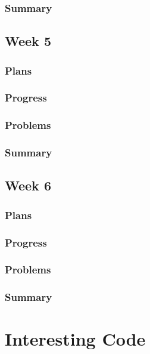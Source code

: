 \documentclass[onecolumn, draftclsnofoot,10pt, compsoc]{article}
\begin{document}
			\subsubsection{Summary}
			
		\subsection{Week 5}
			\subsubsection{Plans}
			
			\subsubsection{Progress}
			
			\subsubsection{Problems}
			
			\subsubsection{Summary}
			
		\subsection{Week 6}
			\subsubsection{Plans}
			
			\subsubsection{Progress}
			
			\subsubsection{Problems}
			
			\subsubsection{Summary}
			
\section{Interesting Code}
\end{document}
